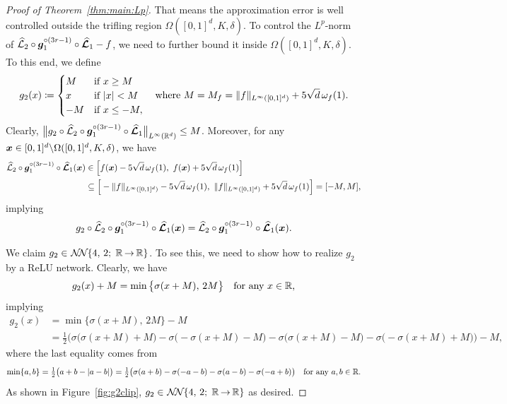 \documentclass[nohyperref]{article}
\theoremstyle{plain}
\theoremstyle{definition}
\theoremstyle{remark}
\begin{document}
\begin{proof}[Proof of Theorem~\ref{thm:main:Lp}]
That means the approximation error is well controlled outside the trifling region $\Omega([0,1]^d,K,\delta)$.
To control the $L^p$-norm of ${\mathcal{\widehat{L}}}_2\circ {\bm{g}}_1^{\circ (3r-1)}\circ {\bm{\mathcal{\widehat{L}}}}_1-f$, we need to further bound it inside $\Omega([0,1]^d,K,\delta)$.
To this end,
	we  define 
	\begin{equation*}
		g_2(x)\coloneqq \begin{cases}
			M & \textnormal{if} \   x\ge M\\
			x &  \textnormal{if} \   |x|< M\\
			-M &  \textnormal{if}  \   x\le -M, 
		\end{cases}\quad \textnormal{where}\  M= M_f= \|f\|_{L^\infty([0,1]^d)}+5\sqrt{d}\,\omega_f(1).
	\end{equation*}
Clearly, $\big\|g_2\circ\hatcalL_2\circ \bmg_1^{\circ (3r-1)}\circ \bmhatcalL_1\big\|_{L^\infty(\R^d)}\le M$. Moreover, for any ${\bm{x}}\in [0,1]^d\backslash\Omega([0,1]^d,K,\delta)$, we have
\begin{equation*}
\begin{split}
		{\mathcal{\widehat{L}}}_2\circ {\bm{g}}_1^{\circ (3r-1)}\circ {\bm{\mathcal{\widehat{L}}}}_1({\bm{x}})
		&\in \Big[f({\bm{x}})-5\sqrt{d}\,\omega_f(1),\   f({\bm{x}})+5\sqrt{d}\,\omega_f(1)\Big]\\
		&\subseteq \Big[-\|f\|_{L^\infty([0,1]^d)}-5\sqrt{d}\,\omega_f(1),\   \|f\|_{L^\infty([0,1]^d)}+5\sqrt{d}\,\omega_f(1)\Big]=  [-M,M],
\end{split}
\end{equation*}
implying 
\begin{equation*}
	g_2\circ {\mathcal{\widehat{L}}}_2\circ {\bm{g}}_1^{\circ (3r-1)}\circ {\bm{\mathcal{\widehat{L}}}}_1({\bm{x}})={\mathcal{\widehat{L}}}_2\circ {\bm{g}}_1^{\circ (3r-1)}\circ {\bm{\mathcal{\widehat{L}}}}_1({\bm{x}}).
\end{equation*}

	We claim $g_2\in \nnOneD{4}{2}{\R}{\R}$. To see this, we need to show how to realize $g_2$ by a ReLU network. Clearly, we have
	\begin{equation*}
		g_2(x)+M=\min\big\{\sigma(x+M),\, 2M\big\}\quad \tn{for any $x\in \R$,}
	\end{equation*}
	implying
	\begin{equation*}
		\begin{split}
					g_2(x)&=\min\big\{\sigma(x+M),\, 2M\big\}-M\\
			&=\tfrac{1}{2}\Big(\sigma\big(\sigma(x+M)+M\big)-\sigma\big(-\sigma(x+M)-M\big)-\sigma\big(\sigma(x+M)-M\big)-\sigma\big(-\sigma(x+M)+M\big)\Big)-M,
		\end{split}
	\end{equation*}
where the last equality comes from 
	\begin{equation*}
		\min\{a,b\}=\tfrac{1}{2}\big(a+b-|a-b|\big)=\tfrac{1}{2}\big(\sigma(a+b)-\sigma(-a-b)-\sigma(a-b)-\sigma(-a+b)\big)\quad \tn{for any $a,b\in \R$}.
	\end{equation*}
As shown in Figure~\ref{fig:g2clip}, $g_2\in \nnOneD{4}{2}{\R}{\R}$ as desired.
	

\end{proof}
\end{document}
